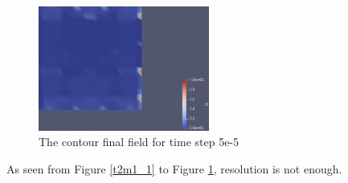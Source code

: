 \documentclass{article}
\begin{document}
\begin{figure}[hbt!]
    \centering
    \includegraphics[width=0.5\textwidth]{Figures/5e-5 20x20/contour.png}
    \caption{The contour final field for time step 5e-5}
    \label{t2m1_2} 
\end{figure}

As seen from Figure \ref{t2m1_1} to Figure \ref{t2m1_2}, resolution is not enough. 


\clearpage
\end{document}

